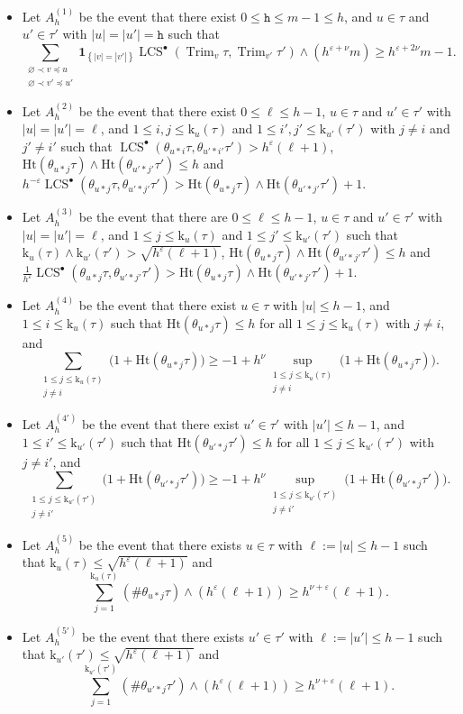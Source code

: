 \documentclass[11pt,reqno]{amsart}
\newcommand{\1}{\mathbf{1}}
\newcommand{\0}{\mathbf{0}}
\newcommand{\tth}{\mathtt{h}}
\newcommand{\I}[1]{{\mathbf 1}_{\left\{#1\right\}}}
\newcommand{\Ht}{\mathrm{Ht}}
\newcommand{\rk}{\mathrm{k}}
\newcommand{\Trim}{\operatorname{Trim}}
\newcommand{\LCS}{\operatorname{LCS}}
\begin{document}
\begin{itemize}
    \item Let $A_h^{(1)}$ be the event that there exist $0\leq \tth\leq m-1\leq h$, and $u\in\tau$ and $u'\in\tau'$ with $|u|=|u'|=\tth$ such that \[\sum_{\substack{\varnothing\prec v\preceq u\\ \varnothing\prec v'\preceq u'}}\I{|v|=|v'|}\LCS^\bullet(\Trim_v\tau,\Trim_{v'}\tau')\wedge (h^{\varepsilon+\nu} m)\geq h^{\varepsilon+2\nu}m-1.\]
    
    \item Let $A_h^{(2)}$ be the event that there exist $0\leq \ell \leq h-1$, $u\in\tau$ and $u'\in\tau'$ with $|u|=|u'|=\ell$, and $1\leq i,j\leq \rk_u(\tau)$ and $1\leq i',j'\leq \rk_{u'}(\tau')$ with $j\neq i$ and $j'\neq i'$ such that $\LCS^\bullet(\theta_{u*i}\tau,\theta_{u'*i'}\tau')> h^\varepsilon(\ell+1)$, $\Ht(\theta_{u*j}\tau)\wedge\Ht(\theta_{u'*j'}\tau')\leq h$ and $h^{-\varepsilon}\LCS^\bullet(\theta_{u*j}\tau,\theta_{u'*j'}\tau')> \Ht(\theta_{u*j}\tau)\wedge\Ht(\theta_{u'*j'}\tau')+1$.
    \item Let $A_h^{(3)}$ be the event that there are $0\leq \ell \leq h-1$, $u\in\tau$ and $u'\in\tau'$ with $|u|=|u'|=\ell$, and $1\leq j\leq \rk_u(\tau)$ and $1\leq j'\leq \rk_{u'}(\tau')$ such that $\rk_u(\tau)\wedge \rk_{u'}(\tau')> \sqrt{h^\varepsilon(\ell+1)}$, $\Ht(\theta_{u*j}\tau)\wedge\Ht(\theta_{u'*j'}\tau')\leq h$ and $\tfrac{1}{h^{\varepsilon}}\LCS^\bullet(\theta_{u*j}\tau,\theta_{u'*j'}\tau') > \Ht(\theta_{u*j}\tau)\wedge\Ht(\theta_{u'*j'}\tau') \!+\! 1$.
    \item Let $A_h^{(4)}$ be the event that there exist $u\in\tau$ with $|u|\leq h-1$, and $1\leq i\leq \rk_u(\tau)$ such that $\Ht(\theta_{u*j}\tau)\leq h$ for all $1\leq j\leq \rk_u(\tau)$ with $j\neq i$, and \[\sum_{\substack{1\leq j\leq \rk_u(\tau) \\ j\neq i}}\big(1+\Ht(\theta_{u*j}\tau)\big)\geq -1+h^\nu \sup_{\substack{1\leq j\leq \rk_u(\tau) \\ j\neq i}}\big(1+\Ht(\theta_{u*j}\tau)\big).\]
    \item Let $A_h^{(4')}$ be the event that there exist $u'\in\tau'$ with $|u'|\leq h-1$, and $1\leq i'\leq \rk_{u'}(\tau')$ such that $\Ht(\theta_{u'*j}\tau')\leq h$ for all $1\leq j\leq \rk_{u'}(\tau')$ with $j\neq i'$, and \[\sum_{\substack{1\leq j\leq \rk_{u'}(\tau') \\ j\neq i'}}\big(1+\Ht(\theta_{u'*j}\tau')\big)\geq -1+h^\nu \sup_{\substack{1\leq j\leq \rk_{u'}(\tau') \\ j\neq i'}}\big(1+\Ht(\theta_{u'*j}\tau')\big).\]
    \item Let $A_h^{(5)}$ be the event that there exists $u\in\tau$ with $\ell:=|u|\leq h-1$ such that $\rk_u(\tau)\leq \sqrt{h^\varepsilon(\ell+1)}$ and \[\sum_{j=1}^{\rk_u(\tau)} (\#\theta_{u*j}\tau)\wedge (h^\varepsilon (\ell+1))\geq h^{\nu+\varepsilon} (\ell+1).\]
    \item Let $A_h^{(5')}$ be the event that there exists $u'\in\tau'$ with $\ell:=|u'|\leq h-1$ such that $\rk_{u'}(\tau')\leq \sqrt{h^\varepsilon(\ell+1)}$ and \[\sum_{j=1}^{\rk_{u'}(\tau')}(\#\theta_{u'*j}\tau')\wedge(h^\varepsilon (\ell+1))\geq h^{\nu+\varepsilon} (\ell+1).\]
\end{itemize}
\end{document}
